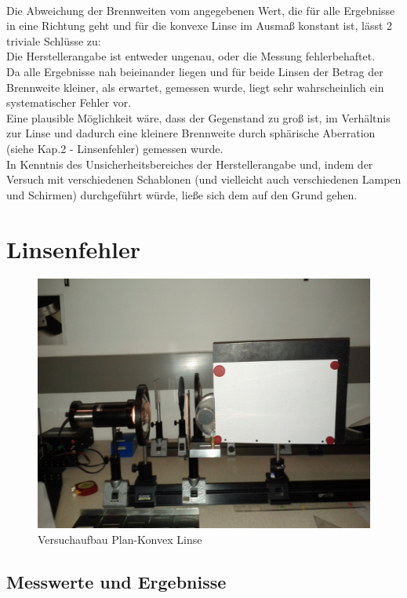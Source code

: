 \documentclass[12pt,a4paper]{article}
\begin{document}
\begin{multicols}{2}
\\
Die Abweichung der Brennweiten vom angegebenen Wert, die für alle Ergebnisse in eine Richtung geht und für die konvexe Linse im Ausmaß konstant ist, lässt 2 triviale Schlüsse zu: \\
Die Herstellerangabe ist entweder ungenau, oder die Messung fehlerbehaftet.\\
Da alle Ergebnisse nah beieinander liegen und für beide Linsen der Betrag der Brennweite kleiner, als erwartet, gemessen wurde, liegt sehr wahrscheinlich ein systematischer Fehler vor. \\
Eine plausible Möglichkeit wäre, dass der Gegenstand zu groß ist, im Verhältnis zur Linse und dadurch eine kleinere Brennweite durch sphärische Aberration (siehe Kap.2 - Linsenfehler) gemessen wurde.\\
In Kenntnis des Unsicherheitsbereiches der Herstellerangabe und, indem der Versuch mit verschiedenen Schablonen (und vielleicht auch verschiedenen Lampen und Schirmen) durchgeführt würde, ließe sich dem auf den Grund gehen.


\section{Linsenfehler}
\begin{figure}[H]
	\centering
	\includegraphics[scale=0.08]{./figure/linsenfehler.jpg}
	\caption{Versuchaufbau Plan-Konvex Linse}
	\label{fig:linsenfehler_aufbau}
\end{figure}
\subsection{Messwerte und Ergebnisse}

\end{multicols}
\end{document}
